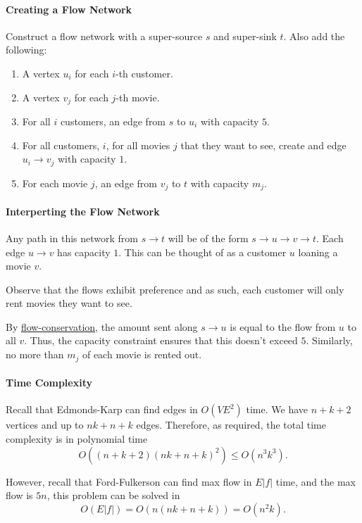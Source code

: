 \paragraph{Creating a Flow Network}
Construct a flow network with a super-source \(s\) and super-sink \(t\).
Also add the following:
\begin{enumerate}
  \item A vertex \(u_i\) for  each \(i\)-th customer.
  \item A vertex \(v_j\) for each  \(j\)-th movie.
  \item For all \(i\) customers, an edge from \(s\) to \(u_i\) with capacity \(5\).
  \item For all  customers, \(i\),  for all movies \(j\) that they want to see,
    create and edge  \(u_i \to  v_j\) with capacity \(1\).
  \item For each movie \(j\), an edge from \(v_j\) to \(t\) with capacity \(m_j\).
\end{enumerate}

\paragraph{Interperting the Flow Network}
Any path in this network from \(s \to t\) will be of the form
\(s \to u \to v \to t\).
Each edge \(u \to v\) has capacity \(1\). This can be thought of
as a customer \(u\) loaning a movie \(v\).

Observe that the flows exhibit preference and as such, each customer will
only rent movies they want to see.

By \underline{flow-conservation}, the amount sent along
\(s \to u\) is equal to the flow from \(u\) to all \(v\).
Thus, the capacity constraint ensures that this doesn't exceed \(5\).
Similarly, no more than \(m_j\) of each movie is rented out.

\paragraph{Time Complexity}
Recall that Edmonds-Karp can find edges in \(O(VE^2)\) time.
We have  \(n + k + 2\) vertices and up to \(nk + n + k\) edges.
Therefore, as required, the total time complexity is in
polynomial time  \[
  O(\left( n + k + 2 \right) \left( nk + n + k \right)^2) \leq O(n^3k^3)
.\] 

However, recall that Ford-Fulkerson can find max flow in \(E|f|\) time,
and the max flow is \(5n\), this problem can be solved in \[
  O(E|f|) = O(n(nk + n + k)) = O(n^2k)
.\] 

